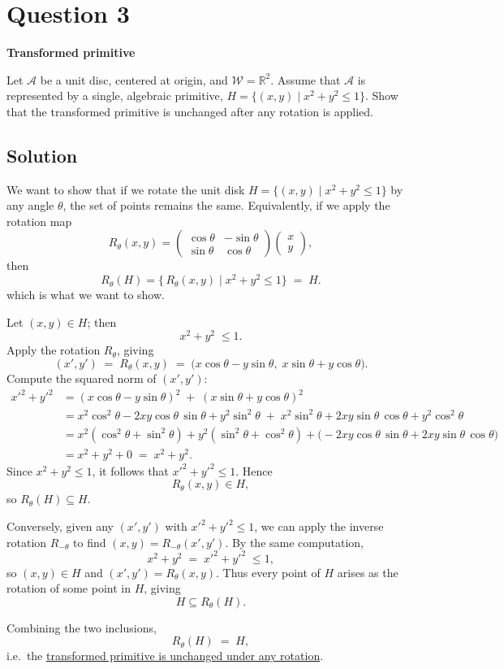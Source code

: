 \section*{Question 3}

\textbf{Transformed primitive}

Let \( \mathcal{A} \) be a unit disc, centered at origin, and \( \mathcal{W} = \mathbb{R}^2 \).
Assume that \( \mathcal{A} \) is represented by a single, algebraic primitive, \( H = \{ (x, y) \mid x^2 + y^2 \leq 1 \} \).
Show that the transformed primitive is unchanged after any rotation is applied.

\subsection*{Solution}

We want to show that if we rotate the unit disk \( H = \{(x,y)\mid x^2+y^2\le1\} \) by any angle \( \theta \), the set of points remains the same. Equivalently, if we apply the rotation map
\[
    R_\theta(x,y)
    =\begin{pmatrix}
        \cos\theta & -\sin\theta \\[6pt]
        \sin\theta & \cos\theta
    \end{pmatrix}
    \begin{pmatrix}x\\y\end{pmatrix},
\]
then
\[
    R_\theta(H)
    =\{\,R_\theta(x,y)\mid x^2+y^2\le1\}
    \;=\;H.
\]
which is what we want to show.

Let \( (x,y)\in H \); then
\[
    x^2+y^2\;\le1.
\]
Apply the rotation \( R_\theta \), giving
\[
    (x',y') \;=\; R_\theta(x,y)
    \;=\;
    \bigl(x\cos\theta - y\sin\theta,\;x\sin\theta + y\cos\theta\bigr).
\]
Compute the squared norm of \( (x',y') \):
\[
    \begin{aligned}
        {x'}^2 + {y'}^2
         & = (x\cos\theta - y\sin\theta)^2 \;+\;(x\sin\theta + y\cos\theta)^2 \\[6pt]
         & = x^2\cos^2\theta - 2xy\cos\theta\,\sin\theta + y^2\sin^2\theta
        \;+\; x^2\sin^2\theta + 2xy\sin\theta\,\cos\theta + y^2\cos^2\theta   \\[6pt]
         & = x^2(\cos^2\theta + \sin^2\theta)
        + y^2(\sin^2\theta + \cos^2\theta)
        + \bigl(-2xy\cos\theta\,\sin\theta + 2xy\sin\theta\,\cos\theta\bigr)  \\[6pt]
         & = x^2 + y^2 + 0
        \;=\; x^2 + y^2.
    \end{aligned}
\]
Since \( x^2+y^2\le1 \), it follows that \( {x'}^2+{y'}^2\le1 \). Hence
\[
    R_\theta(x,y)\in H,
\]
so \( R_\theta(H)\subseteq H \).

Conversely, given any \( (x',y') \) with \( {x'}^2+{y'}^2\le1 \), we can apply the inverse rotation \( R_{-\theta} \) to find \( (x,y)=R_{-\theta}(x',y') \). By the same computation,
\[
    x^2 + y^2 \;=\; {x'}^2 + {y'}^2 \;\le1,
\]
so \( (x,y)\in H \) and \( (x',y')=R_\theta(x,y) \). Thus every point of \( H \) arises as the rotation of some point in \( H \), giving
\[
    H\subseteq R_\theta(H).
\]

Combining the two inclusions,
\[
    R_\theta(H) \;=\; H,
\]
i.e.\ the \underline{transformed primitive is unchanged under any rotation}.

